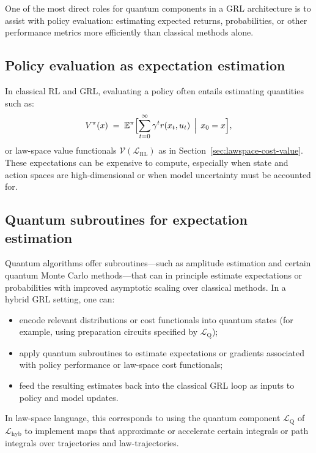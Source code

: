 \documentclass[11pt]{book}
\theoremstyle{plain}
\theoremstyle{definition}
\theoremstyle{remark}
\begin{document}
One of the most direct roles for quantum components in a GRL
architecture is to assist with policy evaluation: estimating
expected returns, probabilities, or other performance metrics more
efficiently than classical methods alone.

\subsection*{Policy evaluation as expectation estimation}

In classical RL and GRL, evaluating a policy often entails estimating
quantities such as:
\[
   V^\pi(x)
   \;=\;
   \mathbb{E}^\pi\Bigl[\sum_{t=0}^\infty \gamma^t r(x_t,u_t)
   \,\Bigm\vert\,x_0=x\Bigr],
\]
or law-space value functionals
$\mathcal{V}(\mathcal{L}_{\mathrm{RL}})$ as in
Section~\ref{sec:lawspace-cost-value}. These expectations can be
expensive to compute, especially when state and action spaces are
high-dimensional or when model uncertainty must be accounted for.

\subsection*{Quantum subroutines for expectation estimation}

Quantum algorithms offer subroutines—such as amplitude estimation
and certain quantum Monte Carlo methods—that can in principle
estimate expectations or probabilities with improved asymptotic
scaling over classical methods. In a hybrid GRL setting, one can:

\begin{itemize}
  \item encode relevant distributions or cost functionals into
        quantum states (for example, using preparation circuits
        specified by $\mathcal{L}_{\mathrm{Q}}$);
  \item apply quantum subroutines to estimate expectations or
        gradients associated with policy performance or law-space
        cost functionals;
  \item feed the resulting estimates back into the classical GRL
        loop as inputs to policy and model updates.
\end{itemize}

In law-space language, this corresponds to using the quantum
component $\mathcal{L}_{\mathrm{Q}}$ of $\mathcal{L}_{\mathrm{hyb}}$
to implement maps that approximate or accelerate certain integrals
or path integrals over trajectories and law-trajectories.
\end{document}
